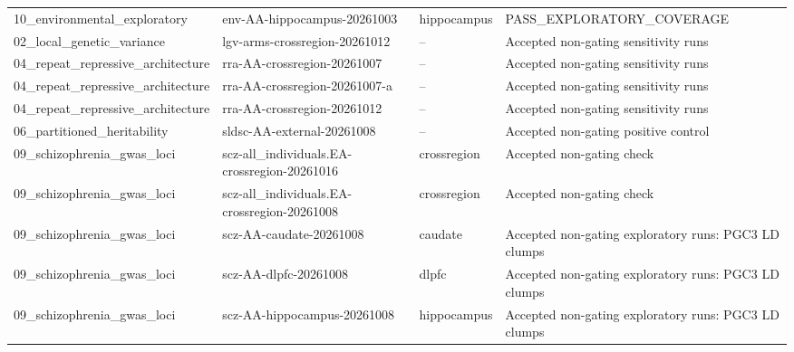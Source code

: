 \begin{tabular}{llll}
10\_environmental\_exploratory & env-AA-hippocampus-20261003 & hippocampus & PASS\_EXPLORATORY\_COVERAGE \\
02\_local\_genetic\_variance & lgv-arms-crossregion-20261012 & -- & Accepted non-gating sensitivity runs \\
04\_repeat\_repressive\_architecture & rra-AA-crossregion-20261007 & -- & Accepted non-gating sensitivity runs \\
04\_repeat\_repressive\_architecture & rra-AA-crossregion-20261007-a & -- & Accepted non-gating sensitivity runs \\
04\_repeat\_repressive\_architecture & rra-AA-crossregion-20261012 & -- & Accepted non-gating sensitivity runs \\
06\_partitioned\_heritability & sldsc-AA-external-20261008 & -- & Accepted non-gating positive control \\
09\_schizophrenia\_gwas\_loci & scz-all\_individuals.EA-crossregion-20261016 & crossregion & Accepted non-gating check \\
09\_schizophrenia\_gwas\_loci & scz-all\_individuals.EA-crossregion-20261008 & crossregion & Accepted non-gating check \\
09\_schizophrenia\_gwas\_loci & scz-AA-caudate-20261008 & caudate & Accepted non-gating exploratory runs: PGC3 LD clumps \\
09\_schizophrenia\_gwas\_loci & scz-AA-dlpfc-20261008 & dlpfc & Accepted non-gating exploratory runs: PGC3 LD clumps \\
09\_schizophrenia\_gwas\_loci & scz-AA-hippocampus-20261008 & hippocampus & Accepted non-gating exploratory runs: PGC3 LD clumps \\
\bottomrule
\end{tabular}

